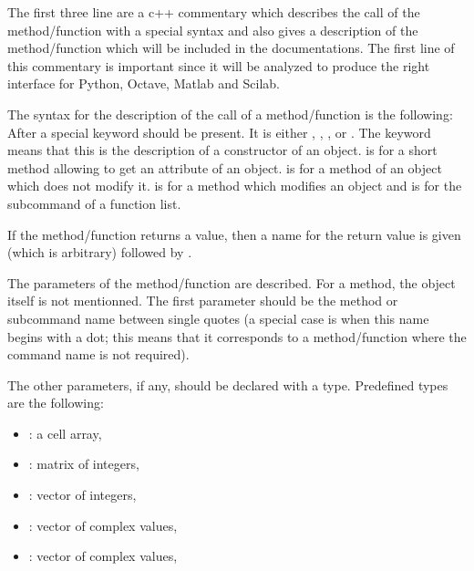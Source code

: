 \documentclass[a4paper,11pt,english]{sphinxmanual}
\begin{document}
\begin{itemize}
The first three line are a c++ commentary which describes the call of the
method/function with a special syntax and also gives a description of the
method/function which will be included in the documentations. The first
line of this commentary is important since it will be analyzed to produce
the right interface for Python, Octave, Matlab and Scilab.

The syntax for the description of the call of a method/function is the
following: After  a special keyword should be present. It is either
, , ,  or . The keyword
 means that
this is the description of a constructor of an object.  is for
a short method allowing to get an attribute of an object.  is for a
method of an object which does not modify it.  is for a method which
modifies an object and  is for the sub\sphinxhyphen{}command of a function list.

If the method/function returns a value, then a name for the return value
is given (which is arbitrary) followed by \sphinxcode{\sphinxupquote{=}}.

The parameters of the method/function are described. For a method, the
object itself is not mentionned. The first parameter should be the method
or sub\sphinxhyphen{}command name between single quotes (a special case is when
this name begins with a dot; this means that it corresponds to a
method/function where the command name is not required).

The other parameters, if any, should be declared with a type. Predefined
types are the following:
\begin{itemize}
\item {} 
   : a cell array,

\item {} 
   : matrix of integers,

\item {} 
   : vector of integers,

\item {} 
   : vector of complex values,

\item {} 
  : vector of complex values,


\end{itemize}
\end{itemize}
\end{document}
